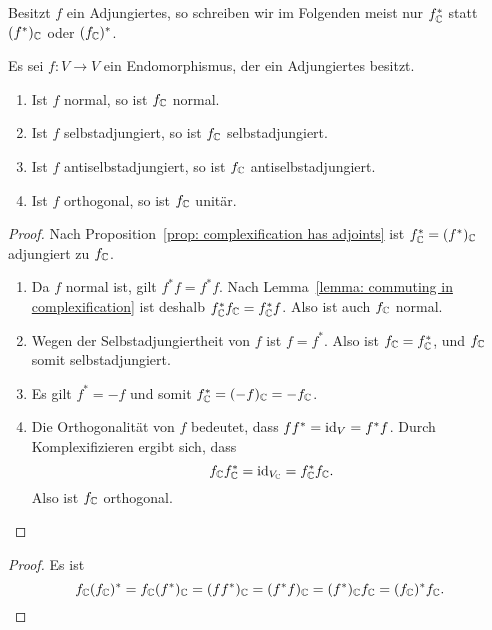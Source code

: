 \documentclass[a4paper,10pt]{article}
\begin{document}
\begin{remark}
  Besitzt $f$ ein Adjungiertes, so schreiben wir im Folgenden meist nur $f^*_{\mathbb{C}}$ statt $(f^*)_{\mathbb{C}}$ oder $(f_{\mathbb{C}})^*$.
\end{remark}


\begin{corollary}\label{cor: complexification preserves normally stuff}
  Es sei $f \colon V \to V$ ein Endomorphismus, der ein Adjungiertes besitzt.
  \begin{enumerate}[leftmargin=*]
    \item
      Ist $f$ normal, so ist $f_{\mathbb{C}}$ normal.
    \item
      Ist $f$ selbstadjungiert, so ist $f_{\mathbb{C}}$ selbstadjungiert.
    \item
      Ist $f$ antiselbstadjungiert, so ist $f_{\mathbb{C}}$ antiselbstadjungiert.
    \item
      Ist $f$ orthogonal, so ist $f_{\mathbb{C}}$ unitär.
  \end{enumerate}
\end{corollary}


\begin{proof}
  Nach Proposition~\ref{prop: complexification has adjoints} ist $f^*_{\mathbb{C}} = (f^*)_{\mathbb{C}}$ adjungiert zu $f_{\mathbb{C}}$.
  \begin{enumerate}[leftmargin=*]
    \item
      Da $f$ normal ist, gilt $f^* f = f^* f$.
      Nach Lemma~\ref{lemma: commuting in complexification} ist deshalb $f^*_{\mathbb{C}} f_{\mathbb{C}} = f^*_{\mathbb{C}} f$.
      Also ist auch $f_{\mathbb{C}}$ normal.
    \item
      Wegen der Selbstadjungiertheit von $f$ ist $f = f^*$.
      Also ist $f_{\mathbb{C}} = f^*_{\mathbb{C}}$, und $f_{\mathbb{C}}$ somit selbstadjungiert.
    \item
      Es gilt $f^* = -f$ und somit $f^*_{\mathbb{C}} = (-f)_{\mathbb{C}} = - f_{\mathbb{C}}$.
    \item
      Die Orthogonalität von $f$ bedeutet, dass $f f^* = \operatorname{id}_V = f^* f$.
      Durch Komplexifizieren ergibt sich, dass
      \[
        f_{\mathbb{C}} f^*_{\mathbb{C}} = \operatorname{id}_{V_{\mathbb{C}}} = f^*_{\mathbb{C}} f_{\mathbb{C}}.
      \]
      Also ist $f_{\mathbb{C}}$ orthogonal.
  \end{enumerate}
\end{proof}


\begin{proof}
  Es ist
  \[
      f_{\mathbb{C}} (f_{\mathbb{C}})^*
    = f_{\mathbb{C}} (f^*)_{\mathbb{C}}
    = (f f^*)_{\mathbb{C}}
    = (f^* f)_{\mathbb{C}}
    = (f^*)_{\mathbb{C}} f_{\mathbb{C}}
    = (f_{\mathbb{C}})^* f_{\mathbb{C}}.
    \qedhere
  \]
\end{proof}
\end{document}
